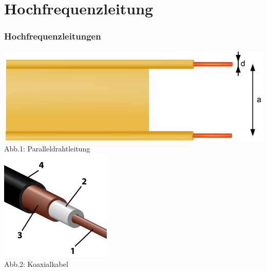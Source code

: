 

\subtitle{Technik Klasse A 10: \\
          HF-Leitungen \& Kabel \\[2em]}
\date{Stand 01.06.2015}



\section*{Hochfrequenzleitung}
\begin{frame}
\frametitle{Hochfrequenzleitungen}
\begin{center}
\includegraphics[scale=0.25]{a10/parallel.png}\\
Abb.1: Paralleldrahtleitung \cite{wp}
\\
\includegraphics[scale=0.4]{a10/coax.png}\\
Abb.2: Koaxialkabel \cite{wm}
\end{center}
\end{frame}

